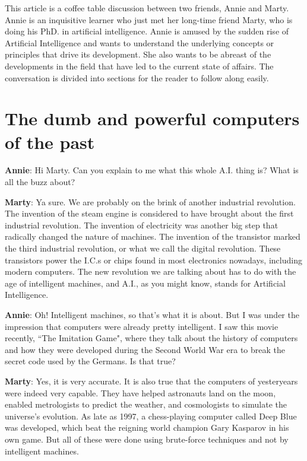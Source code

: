 \documentclass{../template/texnote}
\title{\textbf{\capitalisewords{AI over coffee}}}
\begin{document}
    \maketitle {}

This article is a coffee table discussion between two friends, Annie and Marty. Annie is an inquisitive learner who just met her long-time friend Marty, who is doing his PhD. in artificial intelligence. Annie is amused by the sudden rise of Artificial Intelligence and wants to understand the underlying concepts or principles that drive its development. She also wants to be abreast of the developments in the field that have led to the current state of affairs. The conversation is divided into sections for the reader to follow along easily.

\section{The dumb and powerful computers of the past} 
\noindent

\textbf{Annie}: Hi Marty. Can you explain to me what this whole A.I. thing is? What is all the buzz about?

\textbf{Marty}: Ya sure. We are probably on the brink of another industrial revolution. The invention of the steam engine is considered to have brought about the first industrial revolution. The invention of electricity was another big step that radically changed the nature of machines. The invention of the transistor marked the third industrial revolution, or what we call the digital revolution. These transistors power the I.C.s or chips found in most electronics nowadays, including modern computers. The new revolution we are talking about has to do with the age of intelligent machines, and A.I., as you might know, stands for Artificial Intelligence.

\textbf{Annie}: Oh! Intelligent machines, so that's what it is about. But I was under the impression that computers were already pretty intelligent. I saw this movie recently, ``The Imitation Game", where they talk about the history of computers and how they were developed during the Second World War era to break the secret code used by the Germans. Is that true? 

\textbf{Marty}: Yes, it is very accurate. It is also true that the computers of yesteryears were indeed very capable. They have helped astronauts land on the moon, enabled metrologists to predict the weather, and cosmologists to simulate the universe's evolution. As late as 1997, a chess-playing computer called Deep Blue was developed, which beat the reigning world champion Gary Kasparov in his own game. But all of these were done using brute-force techniques and not by intelligent machines.
\end{document}
